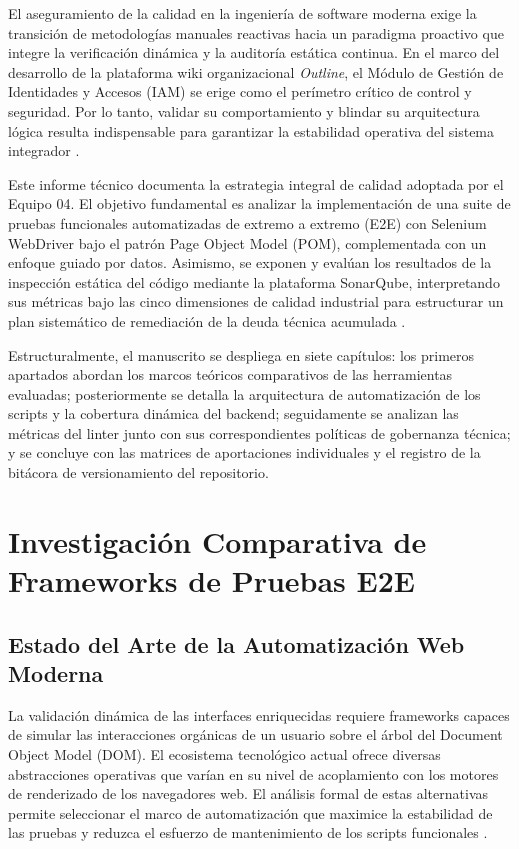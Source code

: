 \documentclass[12pt,oneside]{report}
\begin{document}
El aseguramiento de la calidad en la ingeniería de software moderna exige la transición de metodologías manuales reactivas hacia un paradigma proactivo que integre la verificación dinámica y la auditoría estática continua. En el marco del desarrollo de la plataforma wiki organizacional \textit{Outline}, el Módulo de Gestión de Identidades y Accesos (IAM) se erige como el perímetro crítico de control y seguridad. Por lo tanto, validar su comportamiento y blindar su arquitectura lógica resulta indispensable para garantizar la estabilidad operativa del sistema integrador \parencite{sommerville2011}.

Este informe técnico documenta la estrategia integral de calidad adoptada por el Equipo 04. El objetivo fundamental es analizar la implementación de una suite de pruebas funcionales automatizadas de extremo a extremo (E2E) con Selenium WebDriver bajo el patrón Page Object Model (POM), complementada con un enfoque guiado por datos. Asimismo, se exponen y evalúan los resultados de la inspección estática del código mediante la plataforma SonarQube, interpretando sus métricas bajo las cinco dimensiones de calidad industrial para estructurar un plan sistemático de remediación de la deuda técnica acumulada \parencite{pressman2014}.

Estructuralmente, el manuscrito se despliega en siete capítulos: los primeros apartados abordan los marcos teóricos comparativos de las herramientas evaluadas; posteriormente se detalla la arquitectura de automatización de los scripts y la cobertura dinámica del backend; seguidamente se analizan las métricas del linter junto con sus correspondientes políticas de gobernanza técnica; y se concluye con las matrices de aportaciones individuales y el registro de la bitácora de versionamiento del repositorio.


\chapter{Investigación Comparativa de Frameworks de Pruebas E2E}

\section{Estado del Arte de la Automatización Web Moderna}
La validación dinámica de las interfaces enriquecidas requiere frameworks capaces de simular las interacciones orgánicas de un usuario sobre el árbol del Document Object Model (DOM). El ecosistema tecnológico actual ofrece diversas abstracciones operativas que varían en su nivel de acoplamiento con los motores de renderizado de los navegadores web. El análisis formal de estas alternativas permite seleccionar el marco de automatización que maximice la estabilidad de las pruebas y reduzca el esfuerzo de mantenimiento de los scripts funcionales \parencite{jorgensen2022}.
\end{document}
